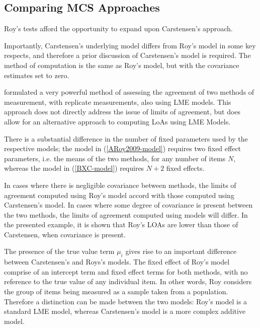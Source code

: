 \documentclass[12pt, a4paper]{report}
\theoremstyle{plain}
\theoremstyle{definition}
\theoremstyle{remark}
\begin{document}
\subsection{Comparing MCS Approaches}
Roy's tests afford the opportunity to expand upon Carstensen's approach. 

Importantly, Carstensen's underlying model differs from Roy's model in some key respects, and therefore a prior discussion of Carstensen's model is required. The method of computation is the
same as Roy's model, but with the covariance estimates set to zero.


\citet{ARoy2009} formulated a very powerful method of assessing the agreement of two methods of measurement, with replicate measurements, also using LME models. This approach does not directly address the issue of limits of agreement, but does allow for an alternative approach to computing LoAs using LME Models. 

There is a substantial difference in the number of fixed parameters used by the respective models; the model in (\ref{ARoy2009-model}) requires two fixed effect parameters, i.e. the means of the two methods, for any number of items $N$, whereas the model in (\ref{BXC-model}) requires $N+2$ fixed effects.


In cases where there is negligible covariance between methods, the limits of agreement computed using Roy's model accord with those computed using Carstensen's model. In cases where some degree of
covariance is present between the two methods, the limits of agreement computed using models will differ. In the presented
example, it is shown that Roy's LOAs are lower than those of Carstensen, when covariance is present.

The presence of the true value term $\mu_i$ gives rise to an important difference between Carstensen's and Roys's models. The fixed effect of Roy's model comprise of an intercept term and fixed effect terms for both methods, with no reference to the true value of any individual item. In other words, Roy considers the group of items being measured as a sample taken from a population. Therefore a distinction can be made between the two models: Roy's model is a standard LME model, whereas Carstensen's model is a more complex additive model.

\end{document}
